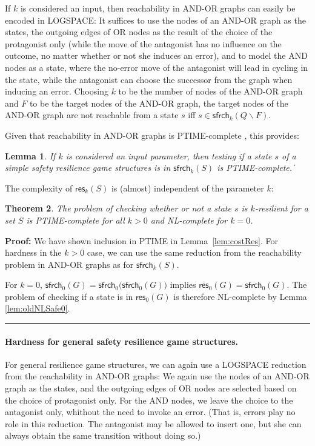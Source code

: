 \documentclass[times,10pt,twocolumn]{article}
\newtheorem{theorem}{Theorem}
\newtheorem{lemma}[theorem]{Lemma}
\newenvironment{proof}{\noindent\par{\bf Proof: }}{\nopagebreak\rule{1 ex}{0.8 em}\medskip}
\newcommand\res{\mathsf{res}}
\newcommand\safe{\mathsf{sfrch}}
\newcommand\qed{\hfill\ensuremath{\Box}}
\def\qed{\ifmmode\|\else{\unskip\nobreak\hfil
\penalty50\hskip1em\null\nobreak\hfil$\blacksquare$
\parfillskip=0pt\finalhyphendemerits=0\endgraf}\fi}
\begin{document}
If $k$ is considered an input, then reachability in AND-OR graphs can easily be encoded in LOGSPACE:
It suffices to use the nodes of an AND-OR graph as the states, the outgoing edges of OR nodes as the result of the choice of the protagonist only (while the move of the antagonist has no influence on the outcome, no matter whether or not she induces an error), and to model the AND nodes as a state, where the no-error move of the antagonist will lead in cycling in the state, while the antagonist can choose the successor from the graph when inducing an error.
Choosing $k$ to be the number of nodes of the AND-OR graph and $F$ to be the target nodes of the AND-OR graph, the target nodes of the AND-OR graph are not reachable from a state $s$ iff $s \in \safe_k(Q\smallsetminus F)$.

Given that reachability in AND-OR graphs is PTIME-complete \cite{Immerman81}, this provides:

\begin{lemma}
\label{lem:ptc}
If $k$ is considered an input parameter, then testing if a state $s$ of a simple safety resilience game structures
 is in $\safe_k(S)$ is PTIME-complete.
\qed
\end{lemma}


The complexity of $\res_k(S)$ is (almost) independent of the parameter $k$:

\begin{theorem}
The problem of checking whether or not a state $s$ is $k$-resilient for a set $S$ is PTIME-complete for all $k>0$ and NL-complete for $k=0$.
\end{theorem}

\begin{proof}
We have shown inclusion in PTIME in Lemma~\ref{lem:costRes}.
For hardness in the $k>0$ case, we can use the same reduction from the reachability problem in AND-OR graphs as for $\safe_k(S)$.

For $k=0$, $\safe_0(G)=\safe_0\big(\safe_0(G)\big)$ implies $\res_0(G)=\safe_0(G)$.
The problem of checking if a state is in $\res_0(G)$ is therefore NL-complete by Lemma \ref{lem:oldNLSafe0}.
\end{proof}

\paragraph{Hardness for general safety resilience game structures.}
For general resilience game structures, we can again use a LOGSPACE reduction from the reachability in AND-OR graphs:
We again use the nodes of an AND-OR graph as the states, and the outgoing edges of OR nodes are selected based on the choice of protagonist only.
For the AND nodes, we leave the choice to the antagonist only, whithout the need to invoke an error.
(That is, errors play no role in this reduction.
The antagonist may be allowed to insert one, but she can always obtain the same transition without doing so.)
\end{document}
